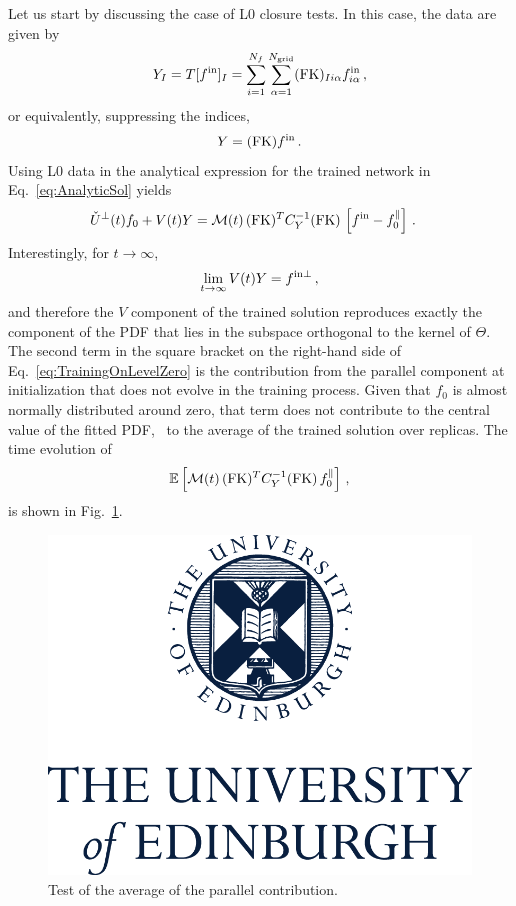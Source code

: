 Let us start by discussing the case of L0 closure tests. In this case, the data are
given by
\begin{equation}
    \label{eq:DataL0}
    Y_I = T[f^{\rm in}]_I
        = \sum_{i=1}^{N_{f}} \sum_{\alpha=1}^{N_{\mathrm{grid}}} (\mathrm{FK})_{Ii\alpha} f^{\rm in}_{i\alpha}\, ,
\end{equation}
or equivalently, suppressing the indices,
\begin{equation}
    \label{eq:DataL0NoIndices}
    Y = (\mathrm{FK}) f^{\rm in}\, .
\end{equation}
Using L0 data in the analytical expression for the trained network in
Eq.~\eqref{eq:AnalyticSol} yields
\begin{align}
  \label{eq:TrainingOnLevelZero}
  \check{U}^\perp(t) f_0 + V(t) Y 
    &= \mathcal{M}(t)\, (\mathrm{FK})^T C_{Y}^{-1} (\mathrm{FK})\, 
      \left[f^{\rm in} - f_{0}^\parallel\right]\, .
\end{align}
Interestingly, for $t\to\infty$,
\begin{align}
    \label{eq:LevelZeroClosureInfiniteTraining}
    \lim_{t\to\infty} V(t) Y = f^{\rm in \perp}\, ,
\end{align}
and therefore the $V$ component of the trained solution reproduces exactly the
component of the PDF that lies in  the subspace orthogonal to the kernel of
$\Theta$. The second term in the square bracket on the right-hand side of 
Eq.~\eqref{eq:TrainingOnLevelZero}
is the contribution from the parallel component at initialization that does not evolve
in the training process. Given that $f_0$ is almost normally distributed around zero, 
that term does not contribute to the central value of the fitted PDF, \ie\ to the average
of the trained solution over replicas. The time evolution of 
\begin{align}
  \label{eq:AverageLevelZeroUcheck}
  \mathbb{E}\left[\mathcal{M}(t)\, (\mathrm{FK})^T C_{Y}^{-1} (\mathrm{FK})\, 
    f_{0}^\parallel\right]\, ,
\end{align}
is shown in Fig.~\ref{fig:AverageLevelZeroUcheck}.
\begin{figure}[h!]
  \centering
  \includegraphics[scale=0.5]{plots/UoECentredLogo282v1160215.png}  
  \caption{Test of the average of the parallel contribution.}
  \label{fig:AverageLevelZeroUcheck}
\end{figure}


